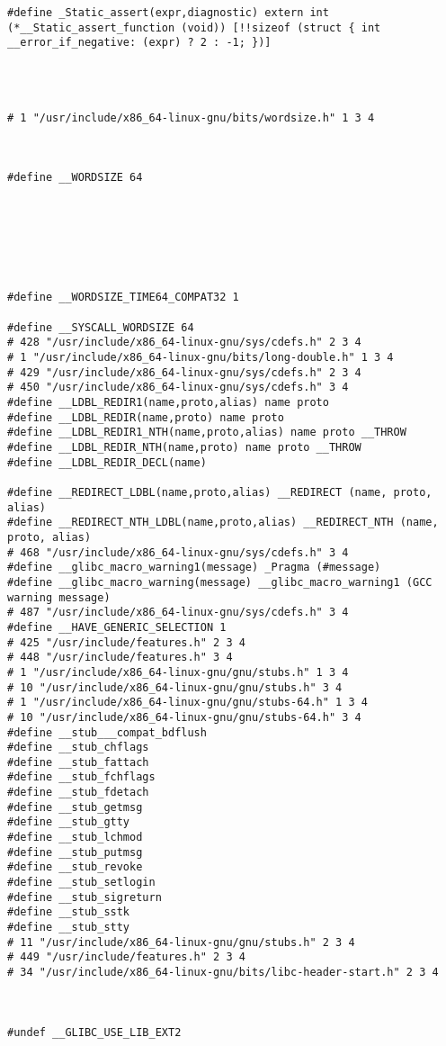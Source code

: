 \documentclass[11pt]{article}
\begin{document}
\begin{verbatim}
#define _Static_assert(expr,diagnostic) extern int (*__Static_assert_function (void)) [!!sizeof (struct { int __error_if_negative: (expr) ? 2 : -1; })]




# 1 "/usr/include/x86_64-linux-gnu/bits/wordsize.h" 1 3 4



#define __WORDSIZE 64







#define __WORDSIZE_TIME64_COMPAT32 1

#define __SYSCALL_WORDSIZE 64
# 428 "/usr/include/x86_64-linux-gnu/sys/cdefs.h" 2 3 4
# 1 "/usr/include/x86_64-linux-gnu/bits/long-double.h" 1 3 4
# 429 "/usr/include/x86_64-linux-gnu/sys/cdefs.h" 2 3 4
# 450 "/usr/include/x86_64-linux-gnu/sys/cdefs.h" 3 4
#define __LDBL_REDIR1(name,proto,alias) name proto
#define __LDBL_REDIR(name,proto) name proto
#define __LDBL_REDIR1_NTH(name,proto,alias) name proto __THROW
#define __LDBL_REDIR_NTH(name,proto) name proto __THROW
#define __LDBL_REDIR_DECL(name) 

#define __REDIRECT_LDBL(name,proto,alias) __REDIRECT (name, proto, alias)
#define __REDIRECT_NTH_LDBL(name,proto,alias) __REDIRECT_NTH (name, proto, alias)
# 468 "/usr/include/x86_64-linux-gnu/sys/cdefs.h" 3 4
#define __glibc_macro_warning1(message) _Pragma (#message)
#define __glibc_macro_warning(message) __glibc_macro_warning1 (GCC warning message)
# 487 "/usr/include/x86_64-linux-gnu/sys/cdefs.h" 3 4
#define __HAVE_GENERIC_SELECTION 1
# 425 "/usr/include/features.h" 2 3 4
# 448 "/usr/include/features.h" 3 4
# 1 "/usr/include/x86_64-linux-gnu/gnu/stubs.h" 1 3 4
# 10 "/usr/include/x86_64-linux-gnu/gnu/stubs.h" 3 4
# 1 "/usr/include/x86_64-linux-gnu/gnu/stubs-64.h" 1 3 4
# 10 "/usr/include/x86_64-linux-gnu/gnu/stubs-64.h" 3 4
#define __stub___compat_bdflush 
#define __stub_chflags 
#define __stub_fattach 
#define __stub_fchflags 
#define __stub_fdetach 
#define __stub_getmsg 
#define __stub_gtty 
#define __stub_lchmod 
#define __stub_putmsg 
#define __stub_revoke 
#define __stub_setlogin 
#define __stub_sigreturn 
#define __stub_sstk 
#define __stub_stty 
# 11 "/usr/include/x86_64-linux-gnu/gnu/stubs.h" 2 3 4
# 449 "/usr/include/features.h" 2 3 4
# 34 "/usr/include/x86_64-linux-gnu/bits/libc-header-start.h" 2 3 4



#undef __GLIBC_USE_LIB_EXT2





\end{verbatim}
\end{document}
